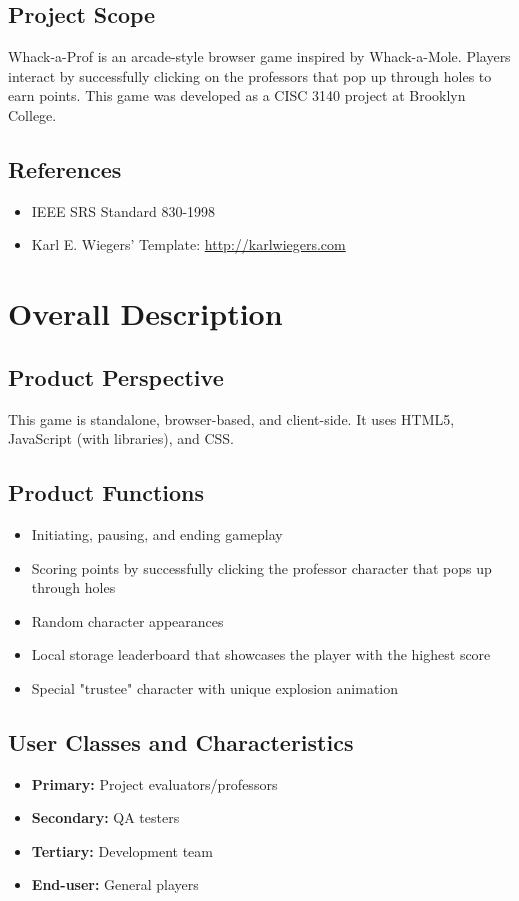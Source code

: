 \documentclass{scrreprt}
\begin{document}
\section{Project Scope}
Whack-a-Prof is an arcade-style browser game inspired by Whack-a-Mole. Players interact by successfully clicking on the professors that pop up through holes to earn points. This game was developed as a CISC 3140 project at Brooklyn College.

\section{References}
\begin{itemize}
    \item IEEE SRS Standard 830-1998
    \item Karl E. Wiegers’ Template: \url{http://karlwiegers.com}
\end{itemize}

\chapter{Overall Description}

\section{Product Perspective}
This game is standalone, browser-based, and client-side. It uses HTML5, JavaScript (with libraries), and CSS.

\section{Product Functions}
\begin{itemize}
    \item Initiating, pausing, and ending gameplay
    \item Scoring points by successfully clicking the professor character that pops up through holes
    \item Random character appearances
    \item Local storage leaderboard that showcases the player with the highest score
    \item Special "trustee" character with unique explosion animation
\end{itemize}

\section{User Classes and Characteristics}
\begin{itemize}
    \item \textbf{Primary:} Project evaluators/professors
    \item \textbf{Secondary:} QA testers
    \item \textbf{Tertiary:} Development team
    \item \textbf{End-user:} General players
\end{itemize}
\end{document}
